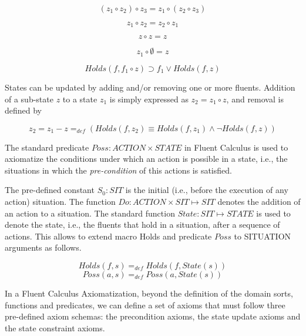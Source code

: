 \begin{equation}
( z_1 \circ z_2 ) \circ z_3 = z_1 \circ ( z_2 \circ z_3 )
\end{equation}

\begin{equation}
z_1 \circ z_2 = z_2 \circ z_1
\end{equation}

\begin{equation}
z \circ z = z
\end{equation}

\begin{equation}
z_1 \circ \emptyset = z
\end{equation}

\begin{equation}
Holds(f, f_1 \circ z) \supset f_1 \vee Holds(f, z)
\end{equation}

States can be updated by adding and/or removing one or more fluents. Addition of
a sub-state $z$ to a state $z_1$ is simply expressed as $z_2 = z_1 \circ z$, and
removal is defined by

\begin{equation}
z_2 = z_1 - z =_{def} (Holds(f, z_2) \equiv Holds(f,
z_1) \land \neg Holds(f, z))
\end{equation} 

The standard predicate $Poss : ACTION \times STATE$ in Fluent Calculus is used to
axiomatize the conditions under which an action is possible in a state, i.e., the situations
in which the \textit{pre-condition} of this actions is satisfied.

The pre-defined constant $S_0 : SIT$ is the initial (i.e., before the execution
of any action) situation. The function $Do : ACTION \times SIT \mapsto SIT$ 
denotes the addition of an action to a situation. The standard function $State
: SIT \mapsto STATE$ is used to denote the state, i.e., the fluents that hold in
a situation, after a sequence of actions. This allows to extend macro Holds and 
predicate $Poss$ to SITUATION arguments as follows.

\begin{equation}
Holds(f, s) =_{def} Holds(f, State(s))
\end{equation}  
\begin{equation}
Poss(a, s) =_{def} Poss(a, State(s))
\end{equation} 

In a Fluent Calculus Axiomatization, beyond the definition of the domain sorts, functions
and predicates, we can define a set of axioms that must follow three pre-defined
axiom schemas: the precondition axioms, the state update axioms and the state constraint
axioms.
 
